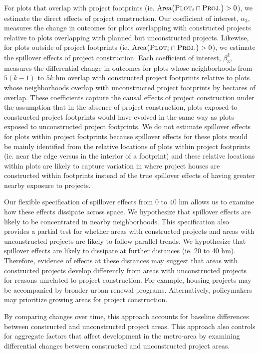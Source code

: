 \documentclass[12pt]{article}
\begin{document}
For plots that overlap with project footprints (ie. $\text{Area}\big(\textsc{Plot}_i  \cap  \textsc{Proj.}\big)>0$), we estimate the direct effects of project construction.  Our coefficient of interest, $\alpha_3$, measures the change in outcomes for plots overlapping with constructed projects relative to plots overlapping with planned but unconstructed projects.  Likewise, for plots outside of project footprints (ie. $\text{Area}\big(\textsc{Plot}_i  \cap  \textsc{Proj.}\big)>0$), we estimate the spillover effects of project construction.  Each coefficient of interest, $\beta_3^{k}$, measures the differential change in outcomes for plots whose neighborhoods from $5(k-1)$ to $5k$ hm overlap with constructed project footprints relative to plots whose neighborhoods overlap with unconstructed project footprints by hectares of overlap.  These coefficients capture the causal effects of project construction under the assumption that in the absence of project construction, plots exposed to constructed project footprints would have evolved in the same way as plots exposed to unconstructed project footprints.  We do not estimate spillover effects for plots within project footprints because spillover effects for these plots would be mainly identified from the relative locations of plots within project footprints (ie. near the edge versus in the interior of a footprint) and these relative locations within plots are likely to capture variation in where project houses are constructed within footprints instead of the true spillover effects of having greater nearby exposure to projects.

Our flexible specification of spillover effects from 0 to 40 hm allows us to examine how these effects dissipate across space.  We hypothesize that spillover effects are likely to be concentrated in nearby neighborhoods.  This specification also provides a partial test for whether areas with constructed projects and areas with unconstructed projects are likely to follow parallel trends.  We hypothesize that spillover effects are likely to dissipate at further distances (ie. 20 to 40 hm).  Therefore, evidence of effects at these distances may suggest that areas with constructed projects develop differently from areas with unconstructed projects for reasons unrelated to project construction.  For example, housing projects may be accompanied by broader urban renewal programs.  Alternatively, policymakers may prioritize growing areas for project construction.

By comparing changes over time, this approach accounts for baseline differences between constructed and unconstructed project areas.  This approach also controls for aggregate factors that affect development in the metro-area by examining differential changes between constructed and unconstructed project areas.  
\end{document}
